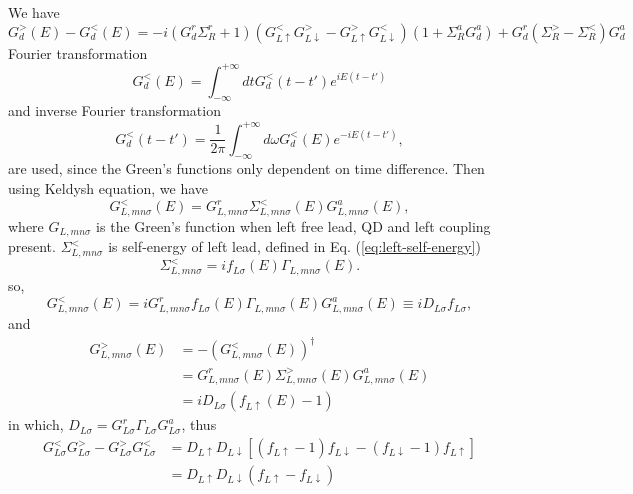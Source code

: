 \documentclass[aps,prb,onecolumn,amssymb,amsmath,superscriptaddress]{revtex4-1}
\begin{document}
We have
\begin{equation}
G_{d}^{>}(E)-G_{d}^{<}(E)=-i\left(G_{d}^{r} \Sigma_{R}^{r}+1\right)\left(G_{L \uparrow}^{<} G_{L \downarrow}^{>}-G_{L \uparrow}^{>} G_{L \downarrow}^{<}\right)\left(1+\Sigma_{R}^{a} G_{d}^{a}\right)+G_{d}^{r}\left(\Sigma_{R}^{>}-\Sigma_{R}^{<}\right) G_{d}^{a}
\end{equation}
Fourier transformation
\begin{equation}
G_{d}^{<}(E) = \int_{-\infty}^{+\infty} dt G_{d}^{<}(t-t')e^{iE(t-t')}
\end{equation}
and inverse Fourier transformation
\begin{equation}
G_{d}^{<}(t-t') = \frac{1}{2\pi}\int_{-\infty}^{+\infty} d\omega G_{d}^{<}(E)e^{-iE(t-t')},
\end{equation}
are used, since the Green's functions only dependent on time difference. Then using Keldysh equation, we have
\begin{equation}
  \label{eq:3}
G_{L,mn\sigma}^{<}(E) = G_{L,mn\sigma}^{r}\Sigma_{L,mn\sigma}^{<}(E) G_{L,mn\sigma}^{a}(E),
\end{equation}
where $G_{L,mn\sigma}$ is the Green's function when left free lead, QD and left coupling present.  $\Sigma_{L,mn\sigma}^{<}$ is self-energy of left lead, defined in Eq. (\ref{eq:left-self-energy})
\begin{equation}
\Sigma_{L,mn\sigma}^{<} = if_{L\sigma}(E) \Gamma_{L,mn\sigma}(E).
\end{equation}
so,
\begin{equation}
G_{L,mn\sigma}^{<}(E) = iG_{L,mn\sigma}^{r}f_{L\sigma}(E) \Gamma_{L,mn\sigma}(E) G_{L,mn\sigma}^{a}(E)  \equiv i D_{L \sigma} f_{L \sigma},
\end{equation}
and
\begin{equation}
\begin{split}
G_{L,mn\sigma}^{>}(E) &= -(G_{L,mn\sigma}^{<}(E))^{\dag} \\
&= G_{L,mn\sigma}^{r}(E)\Sigma_{L,mn\sigma}^{>}(E) G_{L,mn\sigma}^{a}(E)\\
&=iD_{L\sigma}(f_{L\uparrow}(E) - 1)
\end{split}
\end{equation}
in which, $D_{L\sigma} = G_{L\sigma}^{r}\Gamma_{L\sigma}G_{L\sigma}^{a}$, thus
\begin{equation}
\begin{split}
G_{L\sigma}^{<} G_{L\sigma}^{>} - G_{L\sigma}^{>} G_{L\sigma}^{<} &= D_{L\uparrow}D_{L\downarrow} [(f_{L\uparrow}-1)f_{L\downarrow} - (f_{L\downarrow}-1) f_{L\uparrow}] \\
&= D_{L\uparrow}D_{L\downarrow} (f_{L\uparrow} - f_{L\downarrow})
\end{split}
\end{equation}
\end{document}
